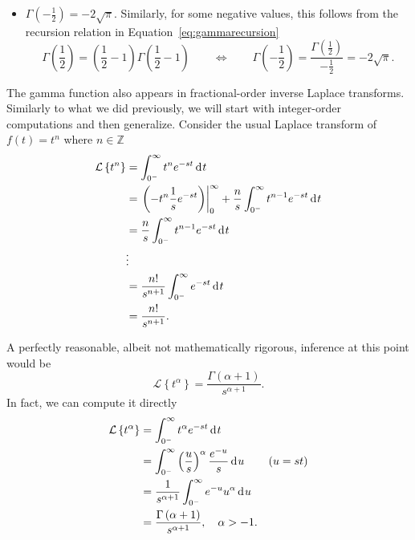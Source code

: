 \begin{itemize}
\begin{equation*}
      \end{equation*}
    \item $\boxed { \Gamma \left( -\frac{1}{2} \right) = -2 \sqrt{\pi}.  }$  Similarly, for some negative values, this follows from the recursion relation in Equation~\ref{eq:gammarecursion}
      \begin{equation*}
	\Gamma \left( \frac{1}{2} \right) = \left( \frac{1}{2} - 1 \right) \Gamma \left( \frac{1}{2} - 1 \right) \qquad \Longleftrightarrow \qquad \Gamma \left( -\frac{1}{2} \right) = \frac{\Gamma \left( \frac{1}{2} \right)}{-\frac{1}{2}} = -2 \sqrt{\pi}.
      \end{equation*}
  \end{itemize}

  The gamma function also appears in fractional-order inverse Laplace transforms. Similarly to what we did previously, we will start with integer-order computations and then generalize. Consider the usual Laplace transform of $f(t) = t^n$ where $n \in \mathbb Z$
  \begin{align*}
    \mathcal L \left\{ t^n \right\} &= \int_{0^-}^\infty t^n e^{-s t} \operatorname{d}\hspace*{-1pt} t \\
    &= \left. \left( - t^n \frac{1}{s} e^{-s t} \right) \right|_0^\infty + \frac{n}{s}  \int_{0^-}^\infty t^{n-1} e^{-st} \operatorname{d}\hspace*{-1pt} t \\
      &= \frac{n}{s}  \int_{0^-}^\infty t^{n-1} e^{-st} \operatorname{d}\hspace*{-1pt} t  \\
      & \vdots \\
      &= \frac{n!}{s^{n+1}} \int_{0^-}^\infty e^{-s t} \operatorname{d}\hspace*{-1pt} t  \\
      &= \frac{n!}{s^{n+1}}. 
    \end{align*}

    A perfectly reasonable, albeit not mathematically rigorous, inference at this point would be 
    \begin{equation*}
      \boxed{ \mathcal L  \left\{ t^\alpha \right\} =  \frac{\Gamma \left( \alpha + 1 \right)}{s^{\alpha + 1}}. }
    \end{equation*}
    In fact, we can compute it directly
    \begin{align*}
      \mathcal L \left\{ t^\alpha \right\} &= \int_{0^-}^\infty t^\alpha e^{-s t} \operatorname{d}\hspace*{-1pt} t \\
      &= \int_{0^-}^\infty \left( \frac{u}{s} \right)^\alpha \frac{e^{-u}}{s} \operatorname{d}\hspace*{-1pt} u \qquad \left( u = st \right) \\
      &= \frac{1}{s^{\alpha + 1}} \int_{0^-}^\infty e^{-u} u^\alpha \operatorname{d}\hspace*{-1pt} u \\
      &= \frac{\Gamma \left( \alpha + 1 \right)}{s^{\alpha + 1}}, \quad \alpha > -1.
    \end{align*}

